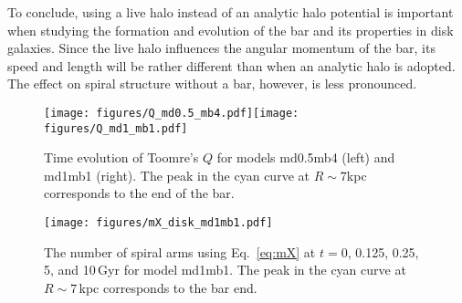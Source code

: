To conclude, using a live halo instead of an analytic halo potential is important when studying the 
formation and evolution of the bar and its properties in disk galaxies. Since the live halo influences the angular 
momentum of the bar, its speed and length will be rather different than when
an analytic halo is adopted. The 
effect on spiral structure without a bar, however, is less pronounced. 


\begin{figure*}
\texttt{[image: figures/Q\_md0.5\_mb4.pdf]}\texttt{[image: figures/Q\_md1\_mb1.pdf]}
\caption{Time evolution of Toomre's $Q$ for models md0.5mb4 (left) and md1mb1 (right). The peak in the cyan curve at $R\sim7$kpc corresponds to the end of the bar.\label{fig:Q_ev}}
\end{figure*}

\begin{figure}
\texttt{[image: figures/mX\_disk\_md1mb1.pdf]}
\caption{The number of spiral arms using Eq.~\ref{eq:mX} at $t=0$, 0.125, 0.25, 5, and 10\,Gyr 
for model md1mb1. The peak in the cyan curve at $R\sim7$\,kpc corresponds to the bar end.
\label{fig:mX_md1mb1}}
\end{figure}

